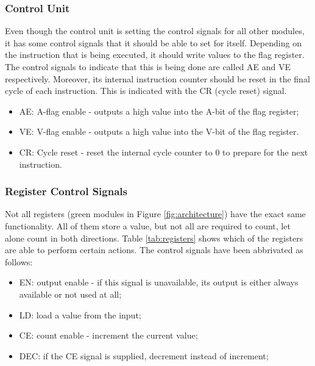 \subsubsection{Control Unit}  \label{sec:architecture:signals:cu}
Even though the control unit is setting the control signals for all other modules, it has some control signals that it should be able to set for itself. Depending on the instruction that is being executed, it should write values to the flag register. The control signals to indicate that this is being done are called AE and VE respectively. Moreover, its internal instruction counter should be reset in the final cycle of each instruction. This is indicated with the CR (cycle reset) signal.
\begin{itemize}
\item AE: A-flag enable - outputs a high value into the A-bit of the flag register;
\item VE: V-flag enable - outputs a high value into the V-bit of the flag register.
\item CR: Cycle reset - reset the internal cycle counter to 0 to prepare for the next instruction.
\end{itemize}


\subsubsection{Register Control Signals}  \label{sec:architecture:signals:register}
Not all registers (green modules in Figure \ref{fig:architecture}) have the exact same functionality. All of them store a value, but not all are required to count, let alone count in both directions. Table \ref{tab:registers} shows which of the registers are able to perform certain actions. The control signals have been abbrivated as follows:
\begin{itemize}
\item EN: output enable - if this signal is unavailable, its output is either always available or not used at all;
\item LD: load a value from the input;
\item CE: count enable - increment the current value;
\item DEC: if the CE signal is supplied, decrement instead of increment;
\end{itemize}

